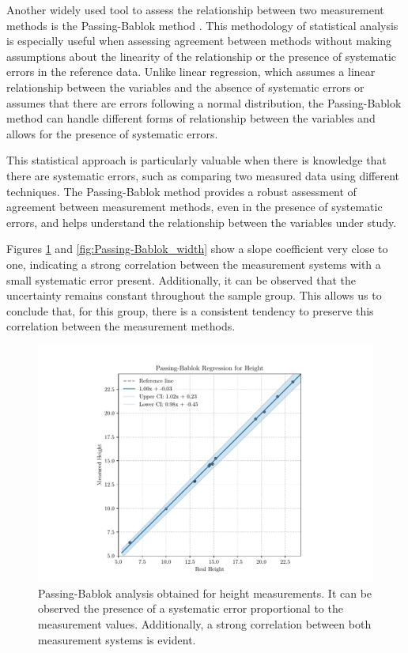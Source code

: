 Another widely used tool to assess the relationship between two measurement methods is the Passing-Bablok method \autocite{Passing1983A}. This methodology of statistical analysis is especially useful when assessing agreement between methods without making assumptions about the linearity of the relationship or the presence of systematic errors in the reference data. Unlike linear regression, which assumes a linear relationship between the variables and the absence of systematic errors or assumes that there are errors following a normal distribution, the Passing-Bablok method can handle different forms of relationship between the variables and allows for the presence of systematic errors.

This statistical approach is particularly valuable when there is knowledge that there are systematic errors, such as comparing two measured data using different techniques. The Passing-Bablok method provides a robust assessment of agreement between measurement methods, even in the presence of systematic errors, and helps understand the relationship between the variables under study.

Figures \ref{fig:Passing-Bablok_height} and \ref{fig:Passing-Bablok_width} show a slope coefficient very close to one, indicating a strong correlation between the measurement systems with a small systematic error present. Additionally, it can be observed that the uncertainty remains constant throughout the sample group. This allows us to conclude that, for this group, there is a consistent tendency to preserve this correlation between the measurement methods.


\begin{figure}
    \centering
    \includegraphics[width=0.75\linewidth]{images/chap5/Passing-Bablok_height.pdf}
    \caption{Passing-Bablok analysis obtained for height measurements. It can be observed the presence of a systematic error proportional to the measurement values. Additionally, a strong correlation between both measurement systems is evident.}
    \label{fig:Passing-Bablok_height}
\end{figure}

